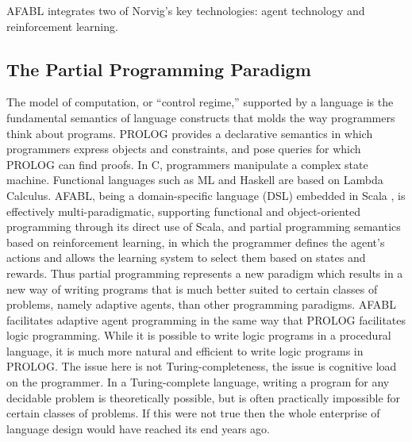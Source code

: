 AFABL integrates two of Norvig's key technologies: agent technology and reinforcement learning.


\subsection{The Partial Programming Paradigm}

The model of computation, or ``control regime,'' supported by a language is the fundamental semantics of language constructs that molds the way programmers think about programs. PROLOG provides a declarative semantics in which programmers express objects and constraints, and pose queries for which PROLOG can find proofs.  In C, programmers manipulate a complex state machine. Functional languages such as ML and Haskell are based on Lambda Calculus. AFABL, being a domain-specific language (DSL) \cite{hudak1996building} embedded in Scala \cite{odersky2008programming,odersky2005scalable}, is effectively multi-paradigmatic, supporting functional and object-oriented programming through its direct use of Scala, and partial programming semantics based on reinforcement learning, in which the programmer defines the agent's actions and allows the learning system to select them based on states and rewards.  Thus partial programming represents a new paradigm which results in a new way of writing programs that is much better suited to certain classes of problems, namely adaptive agents, than other programming paradigms.  AFABL facilitates adaptive agent programming in the same way that PROLOG facilitates logic programming.  While it is possible to write logic programs in a procedural language, it is much more natural and efficient to write logic programs in PROLOG.  The issue here is not Turing-completeness, the issue is cognitive load on the programmer.  In a Turing-complete language, writing a program for any decidable problem is theoretically possible, but is often practically impossible for certain classes of problems.  If this were not true then the whole enterprise of language design would have reached its end years ago.

